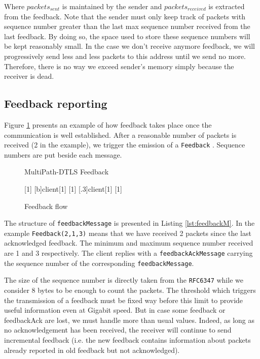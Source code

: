 \documentclass[11pt,a4paper,oldfontcommands]{memoir}
\begin{document}
Where $packets_{sent}$ is maintained by the sender and $packets_{received}$ is extracted from the feedback. Note that the sender must only keep track of packets with sequence number greater than the last max sequence number received from the last feedback. By doing so, the space used to store these sequence numbers will be kept reasonably small. In the case we don't receive anymore feedback, we will progressively send less and less packets to this address until we send no more. Therefore, there is no way we exceed sender's memory simply because the receiver is dead.


\subsection{Feedback reporting}
\label{sec:feedbackReport}


Figure \ref{fig:feedback} presents an example of how feedback takes place once the communication is well established. After a reasonable number of packets is received (2 in the example), we trigger the emission of a \verb!Feedback! . Sequence numbers are put beside each message.


\begin{figure}[!h]
\centering
\begin{msc}[r]{MultiPath-DTLS Feedback}

\setlength{\instfootheight}{0em}
\setlength{\instheadheight}{0em}
\setlength{\instdist}{0.5\linewidth}
\setlength{\levelheight}{3em}


[1]
\nextlevel
{}[b]{}{client}[1]
\nextlevel
{}[1]
\nextlevel
{}[.3]{client}[1]
\nextlevel
{}[1]
\nextlevel

\end{msc}
\caption{Feedback flow}
\label{fig:feedback}
\end{figure}

The structure of \verb!feedbackMessage! is presented in Listing \ref{lst:feedbackM}. In the example \verb!Feedback(2,1,3)! means that we have received 2 packets since the last acknowledged feedback. The minimum and maximum sequence number received are 1 and 3 respectively. The client replies with a \verb!feedbackAckMessage! carrying the sequence number of the corresponding \verb!feedbackMessage!.

The size of the sequence number is directly taken from the \verb!RFC6347!\cite{rfc6347} while we consider 8 bytes to be enough to count the packets. The threshold which triggers the transmission of a feedback must be fixed way before this limit to provide useful information even at Gigabit speed. But in case some feedback or feedbackAck are lost, we must handle more than usual values. Indeed, as long as no acknowledgement has been received, the receiver will continue to send incremental feedback (i.e. the new feedback contains information about packets already reported in old feedback but not acknowledged).
\end{document}

